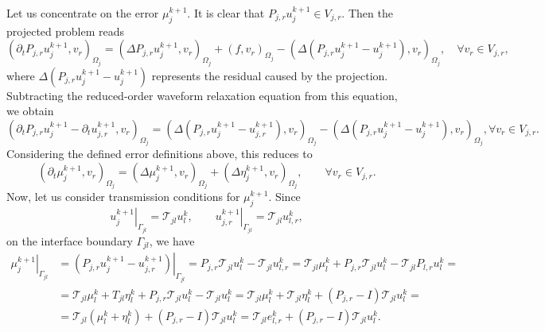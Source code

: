 \documentclass[a4paper, 11pt]{article}
\theoremstyle{plain}
\theoremstyle{definition}
\theoremstyle{remark}
\begin{document}
Let us concentrate on the error $\mu_{j}^{k+1}$. It is clear that $P_{j,r}u_{j}^{k+1}\in V_{j, r}$. Then the projected problem reads
\begin{equation*}
    \left(\partial_{t} P_{j,r}u_{j}^{k+1}, v_{r}\right)_{\Omega_{j}} =  \left(\Delta P_{j,r}u_{j}^{k+1}, v_{r}\right)_{\Omega_{j}} + \left(f, v_{r}\right)_{\Omega_{j}} - \left(\Delta \left(P_{j,r}u_{j}^{k+1} - u_{j}^{k+1}\right), v_{r}\right)_{\Omega_{j}}, \quad \forall v_{r}\in V_{j, r},
\end{equation*}
where $\Delta \left(P_{j,r}u_{j}^{k+1} - u_{j}^{k+1}\right)$ represents the residual caused by the projection. Subtracting the reduced-order waveform
relaxation equation from this equation, we obtain
\begin{equation*}
    \left(\partial_{t} P_{j,r}u_{j}^{k+1} - \partial_{t} u_{j, r}^{k+1}, v_{r}\right)_{\Omega_{j}} =  \left(\Delta \left(P_{j,r}u_{j}^{k+1} - u_{j, r}^{k+1}\right), v_{r}\right)_{\Omega_{j}} - \left(\Delta \left(P_{j,r}u_{j}^{k+1} - u_{j}^{k+1}\right), v_{r}\right)_{\Omega_{j}}, \forall v_{r}\in V_{j, r}.
\end{equation*}
Considering the defined error definitions above, this reduces to
\begin{equation*}
    \left(\partial_{t}\mu_{j}^{k+1}, v_{r}\right)_{\Omega_{j}} =  \left(\Delta \mu_{j}^{k+1}, v_{r}\right)_{\Omega_{j}} + \left(\Delta \eta_{j}^{k+1}, v_{r}\right)_{\Omega_{j}}, \qquad \forall v_{r}\in V_{j, r}.
\end{equation*}
Now, let us consider transmission conditions for $\mu_{j}^{k+1}$. Since 
\begin{equation*}
    \left.u_{j}^{k+1}\right|_{\Gamma_{jl}} = \mathcal{T}_{jl}u_{l}^{k}, \qquad \left.u_{j, r}^{k+1}\right|_{\Gamma_{jl}} = \mathcal{T}_{jl}u_{l, r}^{k},
\end{equation*}
on the interface boundary $\Gamma_{jl}$, we have
\begin{align*}
    \left.\mu_{j}^{k+1}\right|_{\Gamma_{jl}} &= \left.\left(P_{j,r}u_{j}^{k+1} - u_{j, r}^{k+1}\right)\right|_{\Gamma_{jl}} = P_{j,r}\mathcal{T}_{jl}u_{l}^{k} - \mathcal{T}_{jl}u_{l, r}^{k} = \mathcal{T}_{jl}\mu_{l}^{k} + P_{j, r}\mathcal{T}_{jl}u_{l}^{k} - \mathcal{T}_{jl}P_{l, r}u_{l}^{k} = \\
    &= \mathcal{T}_{jl}\mu_{l}^{k} + T_{jl}\eta_{l}^{k} + P_{j, r}\mathcal{T}_{jl}u_{l}^{k} - \mathcal{T}_{jl}u_{l}^{k} = \mathcal{T}_{jl}\mu_{l}^{k} + \mathcal{T}_{jl}\eta_{l}^{k} + \left(P_{j, r} -I \right)\mathcal{T}_{jl}u_{l}^{k} =\\
    &= \mathcal{T}_{jl}\left(\mu_{l}^{k} + \eta_{l}^{k}\right) + \left(P_{j, r} -I \right)\mathcal{T}_{jl}u_{l}^{k} = \mathcal{T}_{jl}e_{l, r}^{k} + \left(P_{j, r} -I \right)\mathcal{T}_{jl}u_{l}^{k}.
\end{align*}
\end{document}
